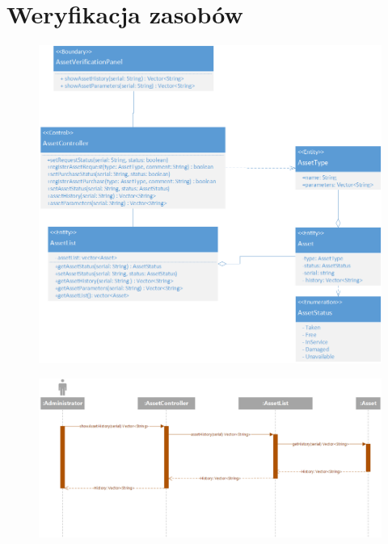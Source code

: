 \documentclass[11pt, a4paper, oneside]{report}
\begin{document}
\section{Weryfikacja zasobów}
\begin{figure}[H]
\centering
\includegraphics[scale=0.5]{weryfikacja.png}
\end{figure}
\begin{figure}[H]
\centering
\includegraphics[scale=0.5]{weryfikacja_sequence.png}
\end{figure}
\end{document}

